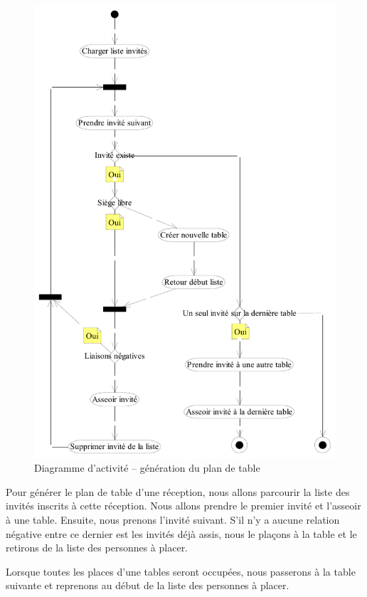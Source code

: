 \begin{figure}
  \centering
  \includegraphics[scale=.88]{IMG/da_plan_tables}
  \caption{Diagramme d'activité -- génération du plan de table}
  \label{img_da_plan_tables}
\end{figure}


Pour générer le plan de table d'une réception, nous allons parcourir la liste des invités inscrits à cette réception. Nous allons prendre le premier invité et l'asseoir à une table. Ensuite, nous prenons l'invité suivant. S'il n'y a aucune relation négative entre ce dernier est les invités déjà assis, nous le plaçons à la table et le retirons de la liste des personnes à placer.

Lorsque toutes les places d'une tables seront occupées, nous passerons à la table suivante et reprenons au début de la liste des personnes à placer.

